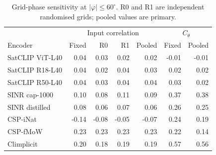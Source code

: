 \begin{table}[htbp]\centering\small
\caption{Grid-phase sensitivity at $|\varphi|\le60^\circ$. R0 and R1 are independent randomised grids; pooled values are primary.}
\label{tab:phase}
\begin{tabular}{@{}lrrrrrr@{}}
\toprule
&\multicolumn{4}{c}{Input correlation}&\multicolumn{2}{c}{$C_\theta$}\\ Encoder&Fixed&R0&R1&Pooled&Fixed&Pooled\\\midrule
SatCLIP ViT-L40&0.04&0.03&0.02&0.02&-0.01&-0.01\\
SatCLIP R18-L40&0.04&0.02&0.04&0.03&0.02&0.02\\
SatCLIP R50-L40&0.04&0.03&0.04&0.04&0.03&0.02\\
SINR cap-1000&0.10&0.08&0.11&0.09&0.37&0.38\\
SINR distilled&0.08&0.06&0.07&0.06&0.26&0.25\\
CSP-iNat&-0.14&-0.08&-0.05&-0.07&0.24&0.19\\
CSP-fMoW&0.23&0.23&0.23&0.23&0.22&0.14\\
Climplicit&0.20&0.18&0.19&0.19&0.57&0.56\\
\bottomrule\end{tabular}

\end{table}
